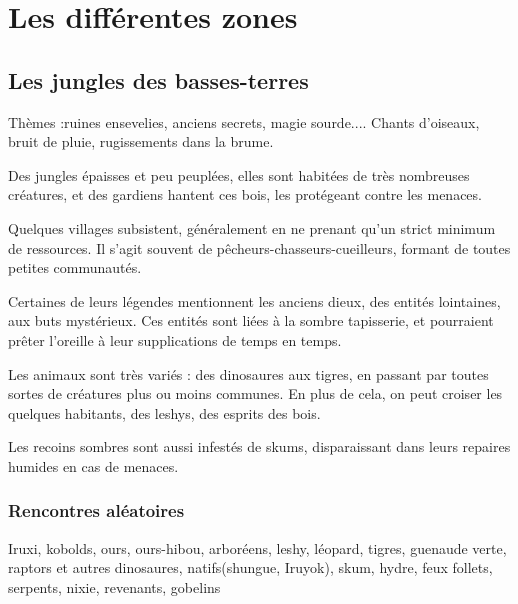 \documentclass[10pt,a4paper]{book}
\begin{document}
\chapter{Les différentes zones}
\section{Les jungles des basses-terres}
Thèmes :ruines ensevelies, anciens secrets, magie sourde.... Chants d'oiseaux, bruit de pluie,  rugissements dans la brume.


Des jungles épaisses et peu peuplées, elles sont habitées de très nombreuses créatures, et des gardiens hantent ces bois, les protégeant contre les menaces.

Quelques villages subsistent, généralement en ne prenant qu'un strict minimum de ressources. Il s'agit souvent de pêcheurs-chasseurs-cueilleurs, formant de toutes petites communautés.

Certaines de leurs légendes mentionnent les anciens dieux, des entités lointaines, aux buts mystérieux. Ces entités sont liées à la sombre tapisserie, et pourraient prêter l'oreille à leur supplications de temps en temps.

Les animaux sont très variés : des dinosaures aux tigres, en passant par toutes sortes de créatures plus ou moins communes. En plus de cela, on peut croiser les quelques habitants, des leshys, des esprits des bois.

Les recoins sombres sont aussi infestés de skums, disparaissant dans leurs repaires humides en cas de menaces.

\subsection{Rencontres aléatoires}
Iruxi, kobolds, ours, ours-hibou, arboréens, leshy, léopard, tigres, guenaude verte, raptors et autres dinosaures, natifs(shungue, Iruyok), skum, hydre, feux follets, serpents, nixie, revenants, gobelins
\end{document}
